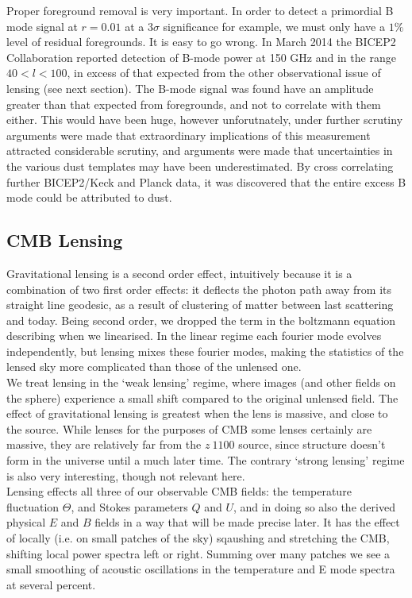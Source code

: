 \documentclass[a4paper,10pt]{article}
\begin{document}
Proper foreground removal is very important. In order to detect a primordial B mode signal at $r=0.01$ at a $3\sigma$ significance for example, we must only have a $1\%$ level of residual foregrounds. It is easy to go wrong. In March 2014 the BICEP2 Collaboration reported detection of B-mode power at 150 GHz and in the range $40<l<100$, in excess of that expected from the other observational issue of lensing (see next section). The B-mode signal was found have an amplitude greater than that expected from foregrounds, and not to correlate with them either. This would have been huge, however unforutnately, under further scrutiny arguments were made that extraordinary implications of this measurement attracted considerable scrutiny, and arguments were made that uncertainties in the various dust templates may have been underestimated. By cross correlating further BICEP2/Keck and Planck data, it was discovered that the entire excess B mode could be attributed to dust. 



\subsection{CMB Lensing}

Gravitational lensing is a second order effect, intuitively because it is a combination of two first order effects: it deflects the photon path away from its straight line geodesic, as a result of clustering of matter between last scattering and today. Being second order, we dropped the term in the boltzmann equation describing when we linearised. In the linear regime each fourier mode evolves independently, but lensing mixes these fourier modes, making the statistics of the lensed sky more complicated than those of the unlensed one. \\

We treat lensing in the `weak lensing' regime, where images (and other fields on the sphere) experience a small shift compared to the original unlensed field. The effect of gravitational lensing is greatest when the lens is massive, and close to the source. While lenses for the purposes of CMB some lenses certainly are massive, they are relatively far from the $z~1100$ source, since structure doesn't form in the universe until a much later time. The contrary `strong lensing' regime is also very interesting, though not relevant here.\\

Lensing effects all three of our observable CMB fields: the temperature fluctuation $\Theta$, and Stokes parameters $Q$ and $U$, and in doing so also the derived physical $E$ and $B$ fields in a way that will be made precise later. It has the effect of locally (i.e. on small patches of the sky) sqaushing and stretching the CMB, shifting local power spectra left or right. Summing over many patches we see a small smoothing of acoustic oscillations in the temperature and E mode spectra at several percent. \\
\end{document}
